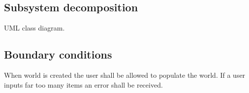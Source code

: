 \documentclass[11pt]{article}
\begin{document}
\subsection{Subsystem decomposition}
UML class diagram.
\subsection{Boundary conditions}
When world is created the user shall be allowed to populate the world. If a user inputs far too many items an error shall be received.

%

 
\end{document}
